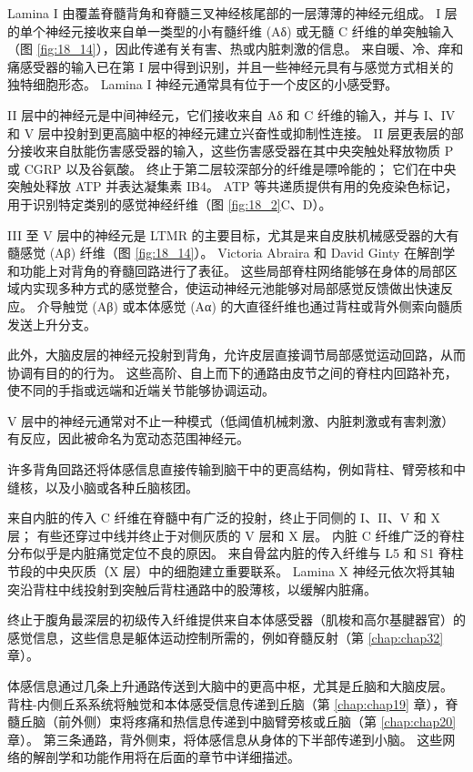 Lamina I 由覆盖脊髓背角和脊髓三叉神经核尾部的一层薄薄的神经元组成。 I 层的单个神经元接收来自单一类型的小有髓纤维 (Aδ) 或无髓 C 纤维的单突触输入（图 \ref{fig:18_14}），因此传递有关有害、热或内脏刺激的信息。 
来自暖、冷、痒和痛感受器的输入已在第 I 层中得到识别，并且一些神经元具有与感觉方式相关的独特细胞形态。 
Lamina I 神经元通常具有位于一个皮区的小感受野。


II 层中的神经元是中间神经元，它们接收来自 Aδ 和 C 纤维的输入，并与 I、IV 和 V 层中投射到更高脑中枢的神经元建立兴奋性或抑制性连接。 
II 层更表层的部分接收来自肽能伤害感受器的输入，这些伤害感受器在其中央突触处释放物质 P 或 CGRP 以及谷氨酸。 
终止于第二层较深部分的纤维是嘌呤能的； 它们在中央突触处释放 ATP 并表达凝集素 IB4。 
ATP 等共递质提供有用的免疫染色标记，用于识别特定类别的感觉神经纤维（图 \ref{fig:18_2}C、D）。


III 至 V 层中的神经元是 LTMR 的主要目标，尤其是来自皮肤机械感受器的大有髓感觉 (Aβ) 纤维（图 \ref{fig:18_14}）。 
Victoria Abraira 和 David Ginty 在解剖学和功能上对背角的脊髓回路进行了表征。 
这些局部脊柱网络能够在身体的局部区域内实现多种方式的感觉整合，使运动神经元池能够对局部感觉反馈做出快速反应。 
介导触觉 (Aβ) 或本体感觉 (Aα) 的大直径纤维也通过背柱或背外侧索向髓质发送上升分支。


此外，大脑皮层的神经元投射到背角，允许皮层直接调节局部感觉运动回路，从而协调有目的的行为。 
这些高阶、自上而下的通路由皮节之间的脊柱内回路补充，使不同的手指或远端和近端关节能够协调运动。


V 层中的神经元通常对不止一种模式（低阈值机械刺激、内脏刺激或有害刺激）有反应，因此被命名为宽动态范围神经元。


许多背角回路还将体感信息直接传输到脑干中的更高结构，例如背柱、臂旁核和中缝核，以及小脑或各种丘脑核团。


来自内脏的传入 C 纤维在脊髓中有广泛的投射，终止于同侧的 I、II、V 和 X 层； 有些还穿过中线并终止于对侧灰质的 V 层和 X 层。 
内脏 C 纤维广泛的脊柱分布似乎是内脏痛觉定位不良的原因。 
来自骨盆内脏的传入纤维与 L5 和 S1 脊柱节段的中央灰质（X 层）中的细胞建立重要联系。 
Lamina X 神经元依次将其轴突沿背柱中线投射到突触后背柱通路中的股薄核，以缓解内脏痛。


终止于腹角最深层的初级传入纤维提供来自本体感受器（肌梭和高尔基腱器官）的感觉信息，这些信息是躯体运动控制所需的，例如脊髓反射（第 \ref{chap:chap32} 章）。


体感信息通过几条上升通路传送到大脑中的更高中枢，尤其是丘脑和大脑皮层。 
背柱-内侧丘系系统将触觉和本体感受信息传递到丘脑（第 \ref{chap:chap19} 章），脊髓丘脑（前外侧）束将疼痛和热信息传递到中脑臂旁核或丘脑（第 \ref{chap:chap20} 章）。 
第三条通路，背外侧束，将体感信息从身体的下半部传递到小脑。 
这些网络的解剖学和功能作用将在后面的章节中详细描述。




